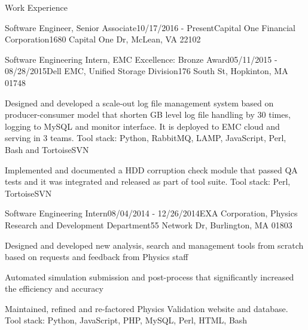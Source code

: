 \documentclass{resume} %
\begin{document}
\begin{rSection}{Work Experience}
\begin{rSubsection}{Software Engineer, Senior Associate}{10/17/2016 - Present}{Capital One Financial Corporation}{1680 Capital One Dr, McLean, VA 22102}
\end{rSubsection}

\begin{rSubsection}{Software Engineering Intern, EMC Excellence: Bronze Award}{05/11/2015 - 08/28/2015}{Dell EMC, Unified Storage Division}{176 South St, Hopkinton, MA 01748}

\item Designed and developed a scale-out log file management system based on producer-consumer model that shorten GB level log file handling by 30 times, logging to MySQL and monitor interface. It is deployed to EMC cloud and serving in 3 teams.
Tool stack: Python, RabbitMQ, LAMP, JavaScript, Perl, Bash and TortoiseSVN

\item Implemented and documented a HDD corruption check module that passed QA tests and it was integrated and released as part of tool suite. 
Tool stack: Perl, TortoiseSVN

\end{rSubsection}





\begin{rSubsection}{Software Engineering Intern}{08/04/2014 - 12/26/2014}{EXA Corporation, Physics Research and Development Department}{55 Network Dr, Burlington, MA 01803}

\item Designed and developed new analysis, search and management tools from scratch based on requests and feedback from Physics staff

\item Automated simulation submission and post-process that significantly increased the efficiency and accuracy

\item Maintained, refined and re-factored Physics Validation website and database. Tool stack: Python, JavaScript, PHP, MySQL, Perl, HTML, Bash

\end{rSubsection}

\end{rSection}
\end{document}

